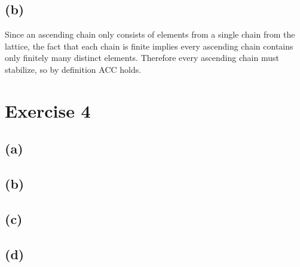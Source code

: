 \documentclass[fleqn,12pt]{article}
\begin{document}
\subsection*{(b)}
Since an ascending chain only consists of elements from a single chain from the lattice, the fact that each chain is finite implies every ascending chain contains only finitely many distinct elements.
Therefore every ascending chain must stabilize, so by definition ACC holds.
\section*{Exercise 4}
\subsection*{(a)}

\subsection*{(b)}

\subsection*{(c)}

\subsection*{(d)}
\end{document}
